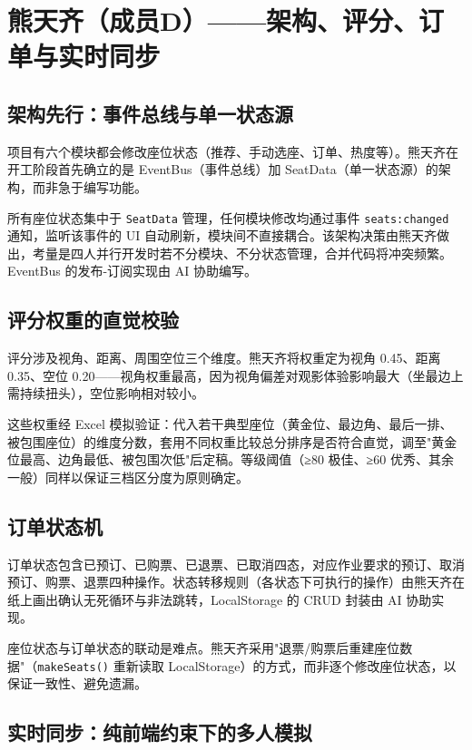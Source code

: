 \documentclass[12pt,a4paper]{ctexart}
\begin{document}
\section{熊天齐（成员D）——架构、评分、订单与实时同步}

\subsection{架构先行：事件总线与单一状态源}

项目有六个模块都会修改座位状态（推荐、手动选座、订单、热度等）。熊天齐在开工阶段首先确立的是 EventBus（事件总线）加 SeatData（单一状态源）的架构，而非急于编写功能。

所有座位状态集中于 \texttt{SeatData} 管理，任何模块修改均通过事件 \texttt{seats:changed} 通知，监听该事件的 UI 自动刷新，模块间不直接耦合。该架构决策由熊天齐做出，考量是四人并行开发时若不分模块、不分状态管理，合并代码将冲突频繁。EventBus 的发布-订阅实现由 AI 协助编写。

\subsection{评分权重的直觉校验}

评分涉及视角、距离、周围空位三个维度。熊天齐将权重定为视角 0.45、距离 0.35、空位 0.20——视角权重最高，因为视角偏差对观影体验影响最大（坐最边上需持续扭头），空位影响相对较小。

这些权重经 Excel 模拟验证：代入若干典型座位（黄金位、最边角、最后一排、被包围座位）的维度分数，套用不同权重比较总分排序是否符合直觉，调至"黄金位最高、边角最低、被包围次低"后定稿。等级阈值（≥80 极佳、≥60 优秀、其余一般）同样以保证三档区分度为原则确定。

\subsection{订单状态机}

订单状态包含已预订、已购票、已退票、已取消四态，对应作业要求的预订、取消预订、购票、退票四种操作。状态转移规则（各状态下可执行的操作）由熊天齐在纸上画出确认无死循环与非法跳转，LocalStorage 的 CRUD 封装由 AI 协助实现。

座位状态与订单状态的联动是难点。熊天齐采用"退票/购票后重建座位数据"（\texttt{makeSeats()} 重新读取 LocalStorage）的方式，而非逐个修改座位状态，以保证一致性、避免遗漏。

\subsection{实时同步：纯前端约束下的多人模拟}
\end{document}
